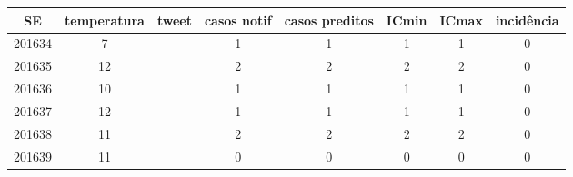 \begin{tabular}{c|ccccccc}
  \hline
SE & temperatura & tweet & casos notif & casos preditos & ICmin & ICmax & incidência \\ 
  \hline
201634 & 7 &  & 1 & 1 & 1 & 1 & 0 \\ 
  201635 & 12 &  & 2 & 2 & 2 & 2 & 0 \\ 
  201636 & 10 &  & 1 & 1 & 1 & 1 & 0 \\ 
  201637 & 12 &  & 1 & 1 & 1 & 1 & 0 \\ 
  201638 & 11 &  & 2 & 2 & 2 & 2 & 0 \\ 
  201639 & 11 &  & 0 & 0 & 0 & 0 & 0 \\ 
   \hline
\end{tabular}
